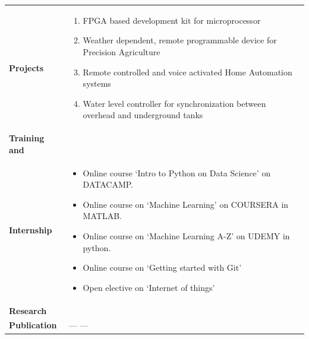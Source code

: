 \documentclass[a4paper,11pt,oneside]{article}
\begin{document}
\begin{tabular}{@{} p{} p{\textwidth}}
 \textbf{\large{Projects}}    
     & \vspace{-1em}
       \begin{enumerate}
            \setlength\itemsep{0.1em}
            \item FPGA based development kit for microprocessor
            \item Weather dependent, remote programmable device for Precision Agriculture
            \item Remote controlled and voice activated Home Automation
            systems
            \item Water level controller for synchronization between overhead and underground tanks
        \end{enumerate} \\
 \textbf{\large{Training and}} & \\
 \textbf{\large{Internship}}
     & \vspace{-3em}
       \begin{itemize}
            \setlength\itemsep{0.1em}
            \item Online course ‘Intro to Python on Data Science’ on DATACAMP.
            \item Online course on ‘Machine Learning’ on COURSERA in MATLAB.
            \item Online course on ‘Machine Learning A-Z’ on UDEMY in python.
            \item Online course on ‘Getting started with Git’
            \item Open elective on ‘Internet of things’
        \end{itemize}  \\
 \textbf{\large{Research}} & \\
 \textbf{\large{Publication}} & \hspace{1em} --- ---  \\
\end{tabular}
\end{document}

